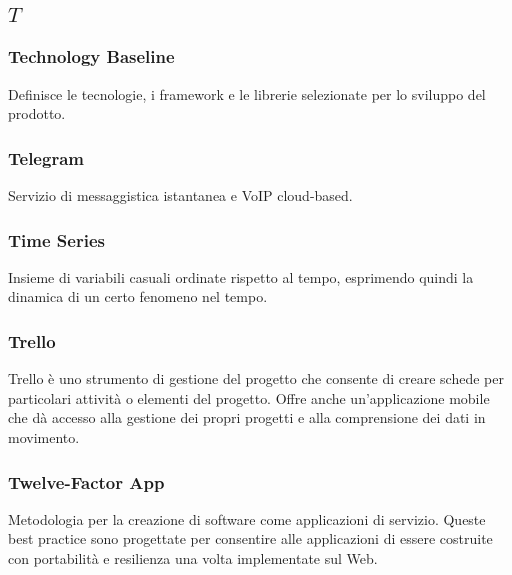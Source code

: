 \subsection*{\quad$T\quad$}
\subsubsection*{Technology Baseline}
Definisce le tecnologie, i framework e le librerie selezionate per lo sviluppo del prodotto.

\subsubsection*{Telegram}
Servizio di messaggistica istantanea  e VoIP cloud-based.


\subsubsection*{Time Series}
Insieme di variabili casuali ordinate rispetto al tempo, esprimendo quindi la dinamica di un certo fenomeno nel tempo.

\subsubsection*{Trello}
Trello è uno strumento di gestione del progetto che consente di creare schede per particolari attività o elementi del progetto. Offre anche un'applicazione mobile che dà accesso alla gestione dei propri progetti e alla comprensione dei dati in movimento. 

\subsubsection*{Twelve-Factor App}
Metodologia per la creazione di software come applicazioni di servizio. Queste best practice sono progettate per consentire alle applicazioni di essere costruite con portabilità e resilienza una volta implementate sul Web.


